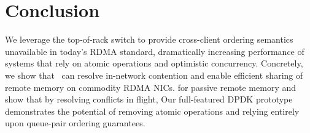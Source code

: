 \section{Conclusion}

We leverage the top-of-rack switch to provide cross-client
ordering semantics unavailable in today's RDMA standard,
dramatically increasing performance of systems that rely on
atomic operations and optimistic concurrency.  Concretely,
we show that \sword\ can resolve in-network contention and
enable efficient sharing of remote memory on commodity RDMA
NICs.  for passive remote memory and show that by resolving
conflicts in flight,
Our full-featured DPDK prototype demonstrates the potential of
 removing atomic operations and relying entirely upon queue-pair
 ordering guarantees.

